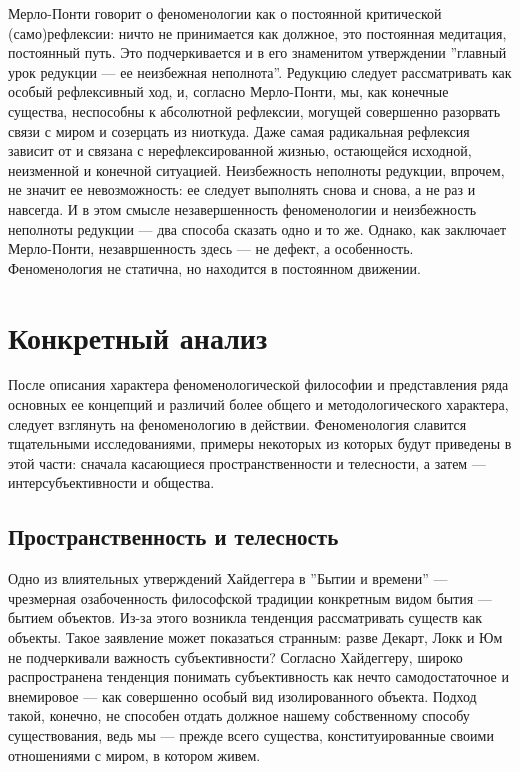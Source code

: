 \documentclass[11pt]{book}
\begin{document}
Мерло-Понти говорит о феноменологии как о постоянной критической (само)рефлексии: ничто не принимается как должное, это постоянная медитация, постоянный путь. Это подчеркивается и в его знаменитом утверждении ''главный урок редукции --- ее неизбежная неполнота''. Редукцию следует рассматривать как особый рефлексивный ход, и, согласно Мерло-Понти, мы, как конечные существа, неспособны к абсолютной рефлексии, могущей совершенно разорвать связи с миром и созерцать из ниоткуда. Даже самая радикальная рефлексия зависит от и связана с нерефлексированной жизнью, остающейся исходной, неизменной и конечной ситуацией. Неизбежность неполноты редукции, впрочем, не значит ее невозможность: ее следует выполнять снова и снова, а не раз и навсегда. И в этом смысле незавершенность феноменологии и неизбежность неполноты редукции --- два способа сказать одно и то же. Однако, как заключает Мерло-Понти, незавршенность здесь --- не дефект, а особенность. Феноменология не статична, но находится в постоянном движении.

\part{Конкретный анализ}

После описания характера феноменологической философии и представления ряда основных ее концепций и различий более общего и методологического характера, следует взглянуть на феноменологию в действии. Феноменология славится тщательными исследованиями, примеры некоторых из которых будут приведены в этой части: сначала касающиеся пространственности и телесности, а затем --- интерсубъективности и общества.

\chapter{Пространственность и телесность}

Одно из влиятельных утверждений Хайдеггера в ''Бытии и времени'' --- чрезмерная озабоченность философской традиции конкретным видом бытия --- бытием объектов. Из-за этого возникла тенденция рассматривать существ как объекты. Такое заявление может показаться странным: разве Декарт, Локк и Юм не подчеркивали важность субъективности? Согласно Хайдеггеру, широко распространена тенденция понимать субъективность как нечто самодостаточное и внемировое --- как совершенно особый вид изолированного объекта. Подход такой, конечно, не способен отдать должное нашему собственному способу существования, ведь мы --- прежде всего существа, конституированные своими отношениями с миром, в котором живем.
\end{document}
